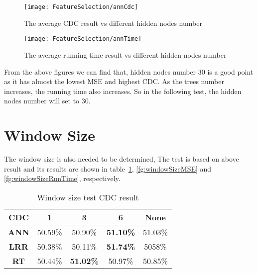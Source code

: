 \begin{figure}[h]
	\centering
	\texttt{[image: FeatureSelection/annCdc]}
	\caption{The average CDC result vs different hidden nodes number}
	\label{fg:annCdcDF}
\end{figure}

\begin{figure}[h]
	\centering
	\texttt{[image: FeatureSelection/annTime]}
	\caption{The average running time result vs different hidden nodes number}
	\label{fg:annRunTimeDf}
\end{figure}

From the above figures we can find that, hidden nodes number 30 is a good point as it has almost the lowest MSE and highest CDC. As the trees number increases, the running time also increases. So in the following test, the hidden nodes number will set to 30.


\section{Window Size}
The window size is also needed to be determined, The test is based on above result and its results are shown in table~\ref{fg:windowSizeCDC}, \ref{fg:windowSizeMSE} and \ref{fg:windowSizeRunTime}, respectively.\\

\begin{table}[h]
	\centering
	\begin{tabular}{|c|c|c|c|c|}
		\hline
		\textbf{CDC} & \textbf{1} & \textbf{3}       & \textbf{6}       & \textbf{None} \\ \hline
		\textbf{ANN} & 50.59\%    & 50.90\%          & \textbf{51.10\%} & 51.03\%       \\ \hline
		\textbf{LRR} & 50.38\%    & 50.11\%          & \textbf{51.74\%} & 5058\%        \\ \hline
		\textbf{RT}  & 50.44\%    & \textbf{51.02\%} & 50.97\%          & 50.85\%       \\ \hline
	\end{tabular}
	\caption{Window size test CDC result}
	\label{fg:windowSizeCDC}
\end{table}

